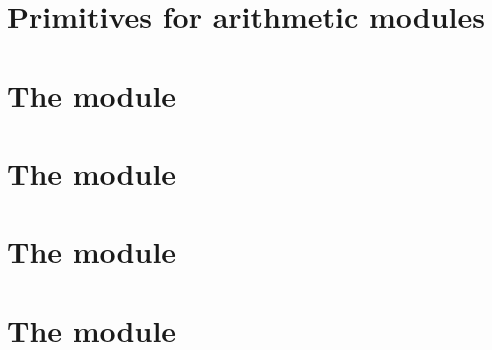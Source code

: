 \chapter{Primitives for arithmetic modules}       \label{alu: primitives}    \minitoc    
\chapter{The \addMod{} module}                    \label{alu: add}           \minitoc    
\chapter{The \mulMod{} module}                    \label{alu: mul}           \minitoc    
\chapter{The \modMod{} module}                    \label{alu: mod}           \minitoc    
\chapter{The \extMod{} module}                    \label{alu: ext}           \minitoc    
